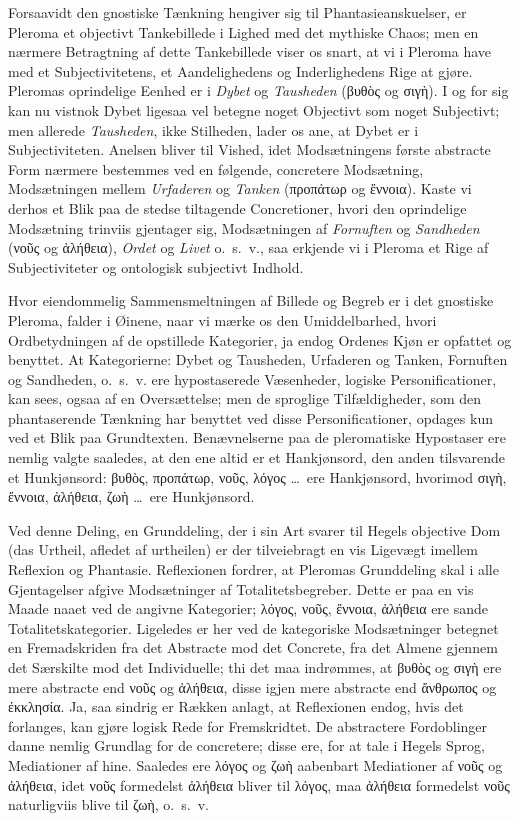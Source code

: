 \documentclass[12pt]{book}
\newcommand{\opage}[1]{\marginnote{\footnotesize\textit{[#1]}}}
\begin{document}
Forsaavidt den gnostiske Tænkning hengiver sig til Phantasieanskuelser,
er Pleroma et objectivt Tankebillede i Lighed
med det mythiske Chaos; men en nærmere Betragtning af
dette Tankebillede viser os snart, at vi i Pleroma have med
et Subjectivitetens, et Aandelighedens og Inderlighedens Rige
at gjøre. Pleromas oprindelige Eenhed er i \emph{Dybet} og
\emph{Tausheden} (βυθὸς og σιγὴ). I og for sig kan nu vistnok
Dybet ligesaa vel betegne noget Objectivt som noget Subjectivt;
men allerede \emph{Tausheden}, ikke Stilheden, lader os
ane, at Dybet er i Subjectiviteten. Anelsen bliver til Vished,
idet Modsætningens første abstracte Form nærmere bestemmes
ved en følgende, concretere Modsætning, Modsætningen
mellem \emph{Urfaderen} og \emph{Tanken} (προπάτωρ og
ἔννοια). Kaste vi derhos et Blik paa de stedse tiltagende
Concretioner, hvori den oprindelige Modsætning trinviis gjentager
sig, Modsætningen af \emph{Fornuften} og \emph{Sandheden}
(νοῦς og ἀλήθεια), \emph{Ordet} og \emph{Livet} o.\ s.\ v., saa erkjende
vi i Pleroma et Rige af Subjectiviteter og ontologisk subjectivt
Indhold.

Hvor eiendommelig Sammensmeltningen af Billede og
Begreb er i det gnostiske Pleroma, falder i Øinene, naar vi
mærke os den Umiddelbarhed, hvori Ordbetydningen af de
opstillede Kategorier, ja endog Ordenes Kjøn er opfattet og
benyttet. At Kategorierne: Dybet og Tausheden, Urfaderen
og Tanken, Fornuften og Sandheden, o.\ s.\ v. ere hypostaserede
Væsenheder, logiske Personificationer, kan sees, ogsaa af en
Oversættelse; men de sproglige Tilfældigheder, som den phantaserende
Tænkning har benyttet ved disse Personificationer,
opdages kun ved et Blik paa Grundtexten. Benævnelserne
paa de pleromatiske Hypostaser ere nemlig valgte saaledes, at
\opage{83}den ene altid er et Hankjønsord, den anden tilsvarende et
Hunkjønsord: βυθὸς, προπάτωρ, νοῦς, λόγος \dots\ ere
Hankjønsord, hvorimod σιγὴ, ἔννοια, ἀλήθεια, ζωὴ \dots\
ere Hunkjønsord.

Ved denne Deling, en Grunddeling, der i sin Art svarer
til Hegels objective Dom (das Urtheil, afledet af urtheilen)
er der tilveiebragt en vis Ligevægt imellem Reflexion og Phantasie.
Reflexionen fordrer, at Pleromas Grunddeling skal i
alle Gjentagelser afgive Modsætninger af Totalitetsbegreber.
Dette er paa en vis Maade naaet ved de angivne Kategorier;
λόγος, νοῦς, ἔννοια, ἀλήθεια ere sande Totalitetskategorier.
Ligeledes er her ved de kategoriske Modsætninger betegnet en
Fremadskriden fra det Abstracte mod det Concrete, fra det
Almene gjennem det Særskilte mod det Individuelle; thi det
maa indrømmes, at βυθὸς og σιγὴ ere mere abstracte end
νοῦς og ἀλήθεια, disse igjen mere abstracte end ἄνθρωπος
og ἐκκλησία. Ja, saa sindrig er Rækken anlagt, at Reflexionen
endog, hvis det forlanges, kan gjøre logisk Rede for Fremskridtet.
De abstractere Fordoblinger danne nemlig Grundlag
for de concretere; disse ere, for at tale i Hegels Sprog, Mediationer
af hine. Saaledes ere λόγος og ζωὴ aabenbart
Mediationer af νοῦς og ἀλήθεια, idet νοῦς formedelst ἀλήθεια
bliver til λόγος, maa ἀλήθεια formedelst νοῦς naturligviis
blive til ζωὴ, o.\ s.\ v.
\end{document}
